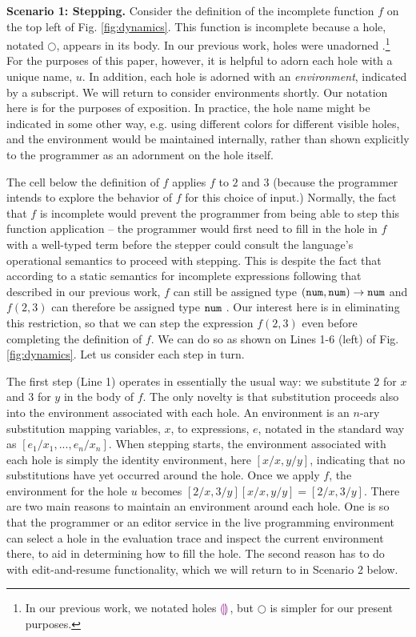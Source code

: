 \noindent\textbf{Scenario 1: Stepping.} Consider the definition of the incomplete function $f$ on the top left of Fig. \ref{fig:dynamics}. 
%
This function is incomplete because a hole, notated $\Circle$, appears in its body. In our previous work, holes were unadorned \cite{popl-paper}.\footnote{In our previous work, we notated holes $\textcolor{violet}{\llparenthesis}\textcolor{violet}{\rrparenthesis}$, but $\Circle$ is simpler for our present purposes.} For the purposes of this paper, however, it is helpful to adorn each hole with a unique name, $u$. In addition, each hole is adorned with an \emph{environment}, indicated by a subscript. We will return to consider environments shortly. Our notation here is for the purposes of exposition. In practice, the hole name might be indicated in some other way, e.g. using different colors for different visible holes, and the environment would be maintained internally, rather than shown explicitly to the programmer as an adornment on the hole itself.

The cell below the definition of $f$ applies $f$ to $2$ and $3$ (because the programmer intends to explore the behavior of $f$ for this choice of input.) Normally, the fact that $f$ is incomplete would prevent the programmer from being able to step this function application -- the programmer would first need to fill in the hole in $f$ with a well-typed term before the stepper could consult the language's operational semantics to proceed with stepping. This is despite the fact that according to a static semantics for incomplete expressions following that described in our previous work, $f$ can still be assigned type $(\texttt{num}, \texttt{num}) \rightarrow \texttt{num}$ and $f(2, 3)$ can therefore be assigned type $\texttt{num}$ \cite{popl-paper}. Our interest here is in eliminating this restriction, so that we can step the expression $f(2, 3)$ even before completing the definition of $f$. We can do so as shown on Lines 1-6 (left) of Fig. \ref{fig:dynamics}.  Let us consider each step in turn. 

The first step (Line 1) operates in essentially the usual way: 
we substitute $2$ for $x$ and $3$ for $y$ in the body of $f$. The only novelty is that substitution proceeds also into the {environment associated with each hole}. An environment is an $n$-ary substitution mapping variables, $x$, to expressions, $e$, notated in the standard way as $[e_1/x_1, ..., e_n/x_n]$. When stepping starts, the environment associated with each hole is simply the identity environment, here $[x/x, y/y]$, indicating that no substitutions have yet occurred around the hole. Once we apply $f$, the environment for the hole $u$ becomes $[2/x, 3/y][x/x, y/y] = [2/x, 3/y]$. There are two main reasons to maintain an environment around each hole. One is so that the programmer or an editor service in the live programming environment can select a hole in the evaluation trace and inspect the current environment there, to aid in determining how to fill the hole. The second reason has to do with edit-and-resume functionality, which we will return to in Scenario 2 below.


